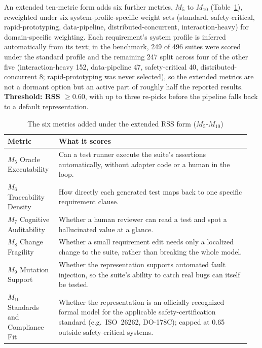 \documentclass[conference]{IEEEtran}
\begin{document}
  An extended ten-metric form adds six further metrics,
  $M_5$ to $M_{10}$ (Table~\ref{tab:extmetrics}), reweighted under six
  system-profile-specific weight sets (standard, safety-critical,
  rapid-prototyping, data-pipeline, distributed-concurrent,
  interaction-heavy) for domain-specific weighting. Each requirement's
  system profile is inferred automatically from its text; in the benchmark,
  249 of 496 suites were scored under the standard profile and the
  remaining 247 split across four of the other five (interaction-heavy 152,
  data-pipeline 47, safety-critical 40, distributed-concurrent 8;
  rapid-prototyping was never selected), so the extended metrics are
  not a dormant option but an active part of roughly half the reported
  results. \textbf{Threshold: RSS $\geq 0.60$}, with up to three re-picks
  before the pipeline falls back to a default representation.




  \begin{table}[t]
  \centering
  \caption{The six metrics added under the extended RSS form ($M_5$-$M_{10}$)}
  \label{tab:extmetrics}
  \small
  \begin{tabular}{@{}p{0.20\linewidth}p{0.75\linewidth}@{}}
  \toprule
  \textbf{Metric} & \textbf{What it scores} \\
  \midrule
  $M_5$ Oracle Executability & Can a test runner execute the suite's assertions automatically, without adapter code or a human in the loop. \\
  $M_6$ Traceability Density & How directly each generated test maps back to one specific requirement clause. \\
  $M_7$ Cognitive Auditability & Whether a human reviewer can read a test and spot a hallucinated value at a glance. \\
  $M_8$ Change Fragility & Whether a small requirement edit needs only a localized change to the suite, rather than breaking the whole model. \\
  $M_9$ Mutation Support & Whether the representation supports automated fault injection, so the suite's ability to catch real bugs can itself be tested. \\
  $M_{10}$ Standards and Compliance Fit & Whether the representation is an officially recognized formal model for the applicable safety-certification standard (e.g.\ ISO~26262, DO-178C); capped at 0.65 outside safety-critical systems. \\
  \bottomrule
  \end{tabular}
  \end{table}
\end{document}
